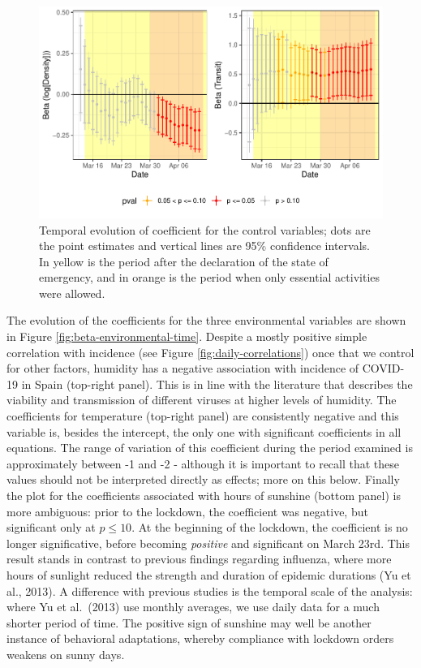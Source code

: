 \documentclass[]{elsarticle} %
\makeatletter
\def\maxwidth{\ifdim\Gin@nat@width>\linewidth\linewidth
\else\Gin@nat@width\fi}
\let\Oldincludegraphics\includegraphics
\renewcommand{\includegraphics}[1]{\Oldincludegraphics[width=\maxwidth]{#1}}
\makeatother
\begin{document}
\begin{figure}
\centering
\includegraphics{Environmental-Correlates-of-COVID19-Spain_files/figure-latex/beta-controls-time-1.pdf}
\caption{\label{fig:beta-controls-time}Temporal evolution of coefficient
for the control variables; dots are the point estimates and vertical
lines are 95\% confidence intervals. In yellow is the period after the
declaration of the state of emergency, and in orange is the period when
only essential activities were allowed.}
\end{figure}

The evolution of the coefficients for the three environmental variables
are shown in Figure \ref{fig:beta-environmental-time}. Despite a mostly
positive simple correlation with incidence (see Figure
\ref{fig:daily-correlations}) once that we control for other factors,
humidity has a negative association with incidence of COVID-19 in Spain
(top-right panel). This is in line with the literature that describes
the viability and transmission of different viruses at higher levels of
humidity. The coefficients for temperature (top-right panel) are
consistently negative and this variable is, besides the intercept, the
only one with significant coefficients in all equations. The range of
variation of this coefficient during the period examined is
approximately between -1 and -2 - although it is important to recall
that these values should not be interpreted directly as effects; more on
this below. Finally the plot for the coefficients associated with hours
of sunshine (bottom panel) is more ambiguous: prior to the lockdown, the
coefficient was negative, but significant only at \(p\leq10\). At the
beginning of the lockdown, the coefficient is no longer significative,
before becoming \emph{positive} and significant on March 23rd. This
result stands in contrast to previous findings regarding influenza,
where more hours of sunlight reduced the strength and duration of
epidemic durations (Yu et al., 2013). A difference with previous studies
is the temporal scale of the analysis: where Yu et al.~(2013) use
monthly averages, we use daily data for a much shorter period of time.
The positive sign of sunshine may well be another instance of behavioral
adaptations, whereby compliance with lockdown orders weakens on sunny
days.
\end{document}
